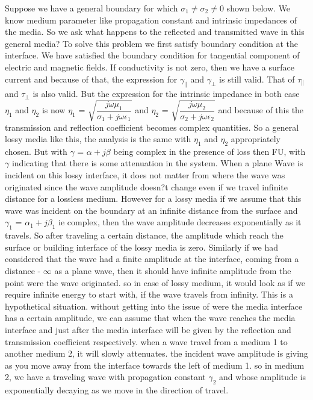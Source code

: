 Suppose we have a general boundary for which $\sigma_1 \neq \sigma_2 \neq 0$ shown below. We know medium parameter like propagation constant and intrinsic impedances of the media. So we ask what happens to the reflected and transmitted wave in this general media? To solve this problem we first satisfy boundary condition at the interface. We have satisfied the boundary condition for tangential component of electric and magnetic fields. If conductivity is not zero, then we have a surface current and because of that, the expression for $\gamma_\parallel$ and $\gamma_\perp$ is still valid. That of $\tau_\parallel$ and $\tau_\perp$ is also valid. But the expression for the intrinsic impedance in both case $\eta_1$ and $\eta_2$ is now $\eta_1$ = $\sqrt{\dfrac{j\omega\mu_1}{\sigma_1 + j\omega\epsilon_1}}$ and $\eta_2$ = $\sqrt{\dfrac{j\omega\mu_2}{\sigma_2 + j\omega\epsilon_2}}$  and because of this the transmission and reflection coefficient becomes complex quantities.
So a general lossy media like this, the analysis is the same with $\eta_1$ and $\eta_2$ appropriately chosen. But with $\gamma$ = $\alpha + j\beta$ being complex in the presence of loss then FU, with $\gamma$ indicating that there is some attenuation in the system. 
When a plane Wave is incident on this lossy interface, it does not matter from where the wave was originated since the wave amplitude doesn?t change even if we travel infinite distance for a lossless medium. However for a lossy media if we assume that this wave was incident on the boundary at an infinite distance from the surface and $\gamma_1$ = $\alpha_1 + j\beta_1$ ie complex, then the wave amplitude decreases exponentially as it travels. So after traveling a certain distance, the amplitude which reach the surface or building interface of the lossy media is zero. Similarly if we had considered that the wave had a finite amplitude at the interface, coming from a distance - $\infty$ as a plane wave, then it should have infinite amplitude from the point were the wave originated. so in case of lossy medium, it would look as if we require infinite energy to start with, if the wave travels from infinity. This is a hypothetical situation. without getting into the issue of were the media interface has a certain amplitude, we can assume that when the wave reaches the media interface and just after the media interface will be given by the reflection and transmission coefficient respectively. when a wave travel from a medium 1 to another medium 2, it will slowly attenuates. the incident wave amplitude is giving as you move away from the interface towards the left of medium 1. so in medium 2, we have a traveling wave with propagation constant $\gamma_2$ and whose amplitude is exponentially decaying as we move in the direction of travel.
